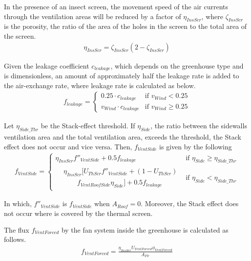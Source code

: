 \documentclass[a4paper]{article}
\numberwithin{equation}{section}
\begin{document}
In the presence of an insect screen, the movement speed of the air currents through the ventilation areas will be reduced by a factor of \( \eta_{InsScr} \), where \( \zeta_{InsScr} \) is the porosity, the ratio of the area of the holes in the screen to the total area of the screen.
\begin{align}
  \eta_{InsScr} = \zeta_{InsScr} (2 -  \zeta_{InsScr})
\end{align}

Given the leakage coefficient \( c_{leakage} \), which depends on the greenhouse type and is dimensionless, an amount of approximately half the leakage rate is added to the air-exchange rate, where leakage rate is calculated as below.
\begin{align}
  f_{leakage} = \begin{cases}
    0.25 \cdot c_{leakage}     & \text{if~} v_{Wind} < 0.25    \\
    v_{Wind} \cdot c_{leakage} & \text{if~} v_{Wind} \geq 0.25
  \end{cases}
\end{align}

Let \( \eta_{Side\_Thr} \) be the Stack-effect threshold. If \( \eta_{Side} \), the ratio between the sidewalls ventilation
area and the total ventilation area, exceeds the threshold, the Stack effect does not occur and vice versa. Then, \( f_{VentSide} \) is given by the following
\begin{gather}
  f_{VentSide} =
  \begin{cases}
    \eta_{InsScr} f''_{VentSide} + 0.5f_{leakage} & \text{if~} \eta_{Side} \geq \eta_{Side\_Thr} \\
    \begin{split}
      & \eta_{InsScr} [U_{ThScr}f''_{VentSide} + (1-U_{ThScr}) \\
      & \qquad f_{VentRoofSide} \eta_{Side}] + 0.5 f_{leakage}
    \end{split}                    & \text{if~} \eta_{Side} < \eta_{Side\_Thr}
  \end{cases}
\end{gather}

In which,  \( f''_{VentSide} \) is  \( f_{VentSide} \) when \( A_{Roof} = 0 \).
Moreover, the Stack effect does not occur where is covered by the thermal screen.

The flux \( f_{VentForced} \) by the fan system inside the greenhouse is calculated as follows.
\begin{align}
  f_{VentForced} = \frac{\eta_{InsScr} U_{VentForced} \phi_{VentForced} } {A_{Flr}}
\end{align}
\end{document}
